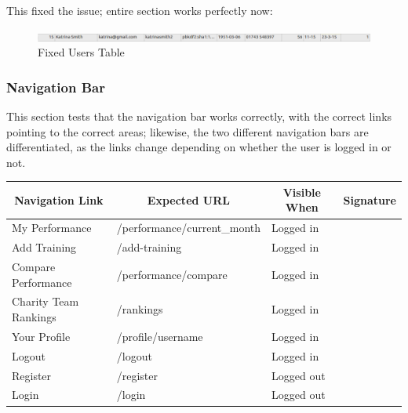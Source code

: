 \documentclass{article}[12pt,a4paper]
\begin{document}
This fixed the issue; entire section works perfectly now:

\begin{figure}[h!]
    \includegraphics[scale=0.33]{images/testing/add_user/database_fixed}
    \caption{Fixed Users Table}
\end{figure}

\subsubsection{Navigation Bar}
This section tests that the navigation bar works correctly, with the correct links pointing to the correct areas; likewise, the two different navigation bars are differentiated, as the links change depending on whether the user is logged in or not.

\begin{table}[h]
\begin{tabular}{|l|l|l|l|}
\hline
\multicolumn{1}{|c|}{\textbf{Navigation Link}} & \multicolumn{1}{c|}{\textbf{Expected URL}} & \multicolumn{1}{c|}{\textbf{Visible When}} & \multicolumn{1}{c|}{\textbf{Signature}} \\ \hline
My Performance                                 & /performance/current\_month                & Logged in                                  &                                                 \\ \hline
Add Training                                   & /add-training                              & Logged in                                  &                                                 \\ \hline
Compare Performance                            & /performance/compare                       & Logged in                                  &                                                 \\ \hline
Charity Team Rankings                          & /rankings                                  & Logged in                                  &                                                 \\ \hline
Your Profile                                   & /profile/username                          & Logged in                                  &                                                 \\ \hline
Logout                                         & /logout                                    & Logged in                                  &                                                 \\ \hline
Register                                       & /register                                  & Logged out                                 &                                                 \\ \hline
Login                                          & /login                                     & Logged out                                 &                                                 \\ \hline
\end{tabular}
\end{table}
\end{document}
